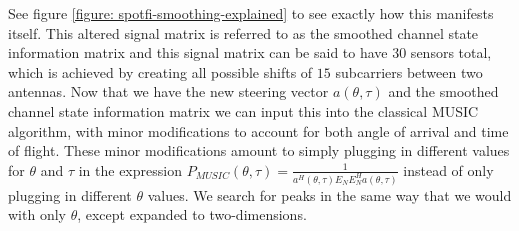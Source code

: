 \documentclass[12pt]{report}
\begin{document}
See figure \ref{figure: spotfi-smoothing-explained} to see exactly how this manifests itself. This altered signal matrix is referred to as the smoothed channel state information matrix and this signal matrix can be said to have $30$ sensors total, which is achieved by creating all possible shifts of $15$ subcarriers between two antennas. Now that we have the new steering vector $a(\theta, \tau)$ and the smoothed channel state information matrix we can input this into the classical MUSIC algorithm, with minor modifications to account for both angle of arrival and time of flight. These minor modifications amount to simply plugging in different values for $\theta$ and $\tau$ in the expression $P_{MUSIC}(\theta, \tau) = \frac{1}{a^{H}(\theta, \tau) E_{N} E^{H}_{N} a(\theta, \tau)}$ instead of only plugging in different $\theta$ values. We search for peaks in the same way that we would with only $\theta$, except expanded to two-dimensions. \par
\end{document}

